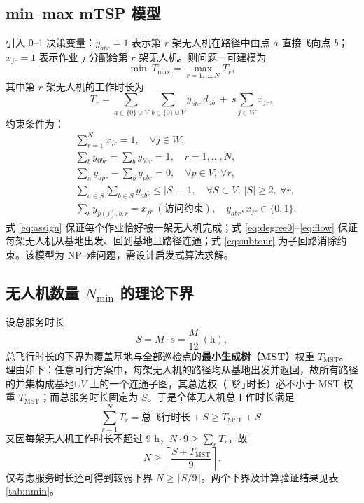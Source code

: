 \documentclass[12pt,a4paper]{ctexart}
\begin{document}
\subsection{min--max mTSP 模型}

引入 0--1 决策变量：$y_{abr}=1$ 表示第 $r$ 架无人机在路径中由点 $a$ 直接飞向点 $b$；$x_{jr}=1$ 表示作业 $j$ 分配给第 $r$ 架无人机。则问题一可建模为
\begin{equation}
  \min\ T_{\max}=\max_{r=1,\dots,N} T_r,
  \label{eq:p1obj}
\end{equation}
其中第 $r$ 架无人机的工作时长为
\begin{equation}
  T_r=\sum_{a\in\{0\}\cup V}\sum_{b\in\{0\}\cup V} y_{abr}\,d_{ab}\ +\ s\sum_{j\in W} x_{jr},
  \label{eq:tr}
\end{equation}
约束条件为：
\begin{align}
  & \sum_{r=1}^{N} x_{jr}=1,\quad \forall j\in W, \label{eq:assign}\\
  & \sum_{b} y_{0br}=\sum_{b} y_{b0r}=1,\quad r=1,\dots,N, \label{eq:degree0}\\
  & \sum_{a} y_{apr} - \sum_{b} y_{pbr}=0,\quad \forall p\in V,\ \forall r, \label{eq:flow}\\
  & \sum_{a\in S}\sum_{b\in S} y_{abr}\le |S|-1,\quad \forall S\subset V,\ |S|\ge 2,\ \forall r, \label{eq:subtour}\\
  & \sum_{b} y_{p(j),b,r} = x_{jr}\ (\text{访问约束}),\quad y_{abr},x_{jr}\in\{0,1\}.
\end{align}
式 \eqref{eq:assign} 保证每个作业恰好被一架无人机完成；式 \eqref{eq:degree0}--\eqref{eq:flow} 保证每架无人机从基地出发、回到基地且路径连通；式 \eqref{eq:subtour} 为子回路消除约束。该模型为 NP--难问题，需设计启发式算法求解。

\subsection{无人机数量 $N_{\min}$ 的理论下界}

设总服务时长
\begin{equation}
  S=M\cdot s=\frac{M}{12}\ (\mathrm{h}),
\end{equation}
总飞行时长的下界为覆盖基地与全部巡检点的\textbf{最小生成树（MST）}权重 $T_{\mathrm{MST}}$。理由如下：任意可行方案中，每架无人机的路径均从基地出发并返回，故所有路径的并集构成基地$\cup V$ 上的一个连通子图，其总边权（飞行时长）必不小于 MST 权重 $T_{\mathrm{MST}}$；而总服务时长固定为 $S$。于是全体无人机总工作时长满足
\begin{equation}
  \sum_{r=1}^{N} T_r = \text{总飞行时长} + S \ge T_{\mathrm{MST}} + S.
\end{equation}
又因每架无人机工作时长不超过 9 h，$N\cdot 9 \ge \sum_r T_r$，故
\begin{equation}
  N \ge \left\lceil \frac{S+T_{\mathrm{MST}}}{9} \right\rceil.
  \label{eq:lb}
\end{equation}
仅考虑服务时长还可得到较弱下界 $N\ge \lceil S/9\rceil$。两个下界及计算验证结果见表 \ref{tab:nmin}。
\end{document}
